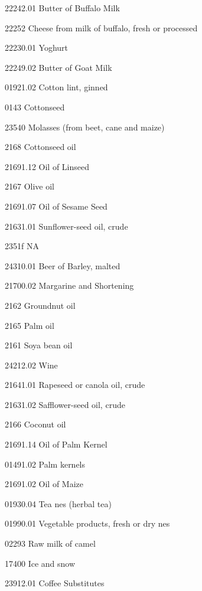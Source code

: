 \documentclass[nojss]{jss}
\begin{document}
\begin{appendices}
\begin{Schunk}
\begin{Soutput}
 22242.01       Butter of Buffalo Milk     

  22252      Cheese from milk of buffalo,  
                  fresh or processed       

 22230.01              Yoghurt             

 22249.02        Butter of Goat Milk       

 01921.02        Cotton lint, ginned       

   0143               Cottonseed           

  23540     Molasses (from beet, cane and  
                        maize)             

   2168             Cottonseed oil         

 21691.12           Oil of Linseed         

   2167               Olive oil            

 21691.07         Oil of Sesame Seed       

 21631.01     Sunflower-seed oil, crude    

  2351f                   NA               

 24310.01       Beer of Barley, malted     

 21700.02      Margarine and Shortening    

   2162             Groundnut oil          

   2165                Palm oil            

   2161             Soya bean oil          

 24212.02                Wine              

 21641.01   Rapeseed or canola oil, crude  

 21631.02     Safflower-seed oil, crude    

   2166              Coconut oil           

 21691.14         Oil of Palm Kernel       

 01491.02            Palm kernels          

 21691.02            Oil of Maize          

 01930.04        Tea nes (herbal tea)      

 01990.01    Vegetable products, fresh or  
                       dry nes             

  02293           Raw milk of camel        

  17400              Ice and snow          

 23912.01         Coffee Substitutes       


\end{Soutput}
\end{Schunk}
\end{appendices}
\end{document}
